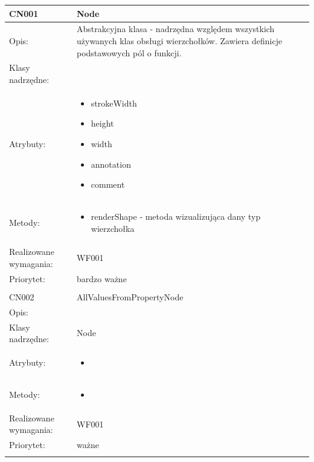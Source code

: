 \documentclass[a4paper,10pt]{article}
\begin{document}
\begin{center}
 


\begin{longtable}{|m{3cm}|m{9cm}|} \hline

CN001 & Node \\ \hline
Opis: & Abstrakcyjna klasa - nadrzędna względem wszystkich używanych klas obsługi wierzchołków. Zawiera definicje podstawowych pól o funkcji.    \\ \hline
Klasy nadrzędne: &     \\ \hline
Atrybuty: & \begin{itemize}
 \item strokeWidth
 \item height
 \item width
 \item annotation
 \item comment 
\end{itemize}
 \\ \hline
Metody: & \begin{itemize}
 \item renderShape - metoda wizualizująca dany typ wierzchołka
\end{itemize}
  \\ \hline
Realizowane wymagania: & WF001 \\ \hline
Priorytet: & bardzo ważne  \\ \hline

\multicolumn{2}{c}{} \\
 \hline

CN002 & AllValuesFromPropertyNode \\ \hline
Opis: &     \\ \hline
Klasy nadrzędne: & Node     \\ \hline
Atrybuty: & \begin{itemize}
 \item 
\end{itemize}
 \\ \hline
Metody: & \begin{itemize}
 \item 
\end{itemize}
  \\ \hline
Realizowane wymagania: & WF001 \\ \hline
Priorytet: & ważne \\ \hline

\multicolumn{2}{c}{} \\
 \hline


\end{longtable}
\end{center}
\end{document}
